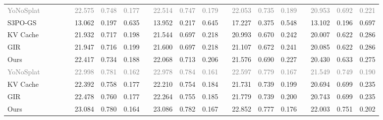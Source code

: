 \documentclass[runningheads]{llncs}
\newcommand{\cmark}{\ding{51}}
\newcommand{\xmark}{\ding{55}}
\newcommand{\high}[1]{\cellcolor{bestcell}#1}
\newcommand{\med}[1]{\cellcolor{secondcell}#1}
\begin{document}
\begin{table}[tb]
{\begin{tabular}{@{} lccc 
        p{0.5em}
        *{3}{c} p{0.5em}
        *{3}{c} p{0.5em}
        *{3}{c} p{0.5em}
        *{3}{c} @{}}
        \textcolor{gray}{\small YoNoSplat} & \textcolor{gray}{\small \xmark} & & \textcolor{gray}{\small \cmark} & & \textcolor{gray}{\small 22.575} & \textcolor{gray}{\small 0.748} & \textcolor{gray}{\small 0.177} & & \textcolor{gray}{\small 22.514} & \textcolor{gray}{\small 0.747} & \textcolor{gray}{\small 0.179} & & \textcolor{gray}{\small 22.053} & \textcolor{gray}{\small 0.735} & \textcolor{gray}{\small 0.189} & & \textcolor{gray}{\small 20.953} & \textcolor{gray}{\small 0.692} & \textcolor{gray}{\small 0.221} \\
        S3PO-GS       & & & \cmark & & {13.062} & {0.197} & {0.635} & & {13.952} & {0.217} & {0.645} & & {17.227} & {0.375} & {0.548} & & {13.102} & {0.196} & {0.697} \\
        KV Cache  & & & \cmark & & {21.932} & \med{0.717} & \med{0.198} & & {21.544} & \med{0.697} & \med{0.218} & & {20.993} & {0.670} & {0.242} & & {20.007} & \med{0.622} & \med{0.286} \\
        GIR   & & & \cmark & & \med{21.947} & {0.716} & {0.199} & & \med{21.600} & \med{0.697} & \med{0.218} & & \med{21.107} & \med{0.672} & \med{0.241} & & \med{20.085} & \med{0.622} & \med{0.286} \\
        \rowcolor{grayhighlight}
        Ours      & & & \cmark & & \high{22.417} & \high{0.734} & \high{0.188} & & \high{22.068} & \high{0.713} & \high{0.206} & & \high{21.576} & \high{0.690} & \high{0.227} & & \high{20.430} & \high{0.633} & \high{0.275} \\
        
        \midrule
        
        \textcolor{gray}{\small YoNoSplat} & \textcolor{gray}{\small \xmark} & \textcolor{gray}{\small \cmark} & \textcolor{gray}{\small \cmark} & & \textcolor{gray}{\small 22.998} & \textcolor{gray}{\small 0.781} & \textcolor{gray}{\small 0.162} & & \textcolor{gray}{\small 22.978} & \textcolor{gray}{\small 0.784} & \textcolor{gray}{\small 0.161} & & \textcolor{gray}{\small 22.597} & \textcolor{gray}{\small 0.779} & \textcolor{gray}{\small 0.167} & & \textcolor{gray}{\small 21.549} & \textcolor{gray}{\small 0.749} & \textcolor{gray}{\small 0.190} \\
        KV Cache  & & \cmark & \cmark & & {22.392} & {0.758} & \med{0.177} & & {22.210} & {0.754} & \med{0.184} & & {21.731} & \med{0.739} & \med{0.199} & & {20.694} & \med{0.699} & \med{0.235} \\
        GIR       & & \cmark & \cmark & & \med{22.478} & \med{0.760} & \med{0.177} & & \med{22.264} & \med{0.755} & {0.185} & & \med{21.779} & \med{0.739} & {0.200} & & \med{20.743} & \med{0.699} & \med{0.235} \\
        \rowcolor{grayhighlight}
        Ours      & & \cmark & \cmark & & \high{23.084} & \high{0.780} & \high{0.164} & & \high{23.086} & \high{0.782} & \high{0.167} & & \high{22.852} & \high{0.777} & \high{0.176} & & \high{22.003} & \high{0.751} & \high{0.202} \\
        

\end{tabular}}
\end{table}
\end{document}
